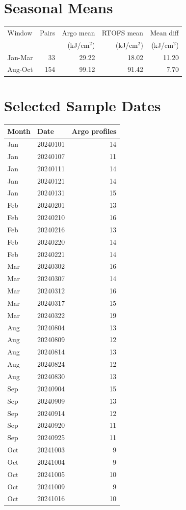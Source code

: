 \documentclass[11pt]{article}
\begin{document}
\section*{Seasonal Means}
\begin{table}[H]
\centering
\begin{tabular}{l r r r r}
\toprule
Window & Pairs & Argo mean & RTOFS mean & Mean diff \\
 &  & (kJ/cm$^2$) & (kJ/cm$^2$) & (kJ/cm$^2$) \\
\midrule
Jan-Mar & 33 & 29.22 & 18.02 & 11.20 \\
Aug-Oct & 154 & 99.12 & 91.42 & 7.70 \\
\bottomrule
\end{tabular}
\end{table}

\section*{Selected Sample Dates}
\begin{table}[H]
\centering
\begin{tabular}{l l r}
\toprule
Month & Date & Argo profiles \\
\midrule
Jan & 20240101 & 14 \\
Jan & 20240107 & 11 \\
Jan & 20240111 & 14 \\
Jan & 20240121 & 14 \\
Jan & 20240131 & 15 \\
Feb & 20240201 & 13 \\
Feb & 20240210 & 16 \\
Feb & 20240216 & 13 \\
Feb & 20240220 & 14 \\
Feb & 20240221 & 14 \\
Mar & 20240302 & 16 \\
Mar & 20240307 & 14 \\
Mar & 20240312 & 16 \\
Mar & 20240317 & 15 \\
Mar & 20240322 & 19 \\
Aug & 20240804 & 13 \\
Aug & 20240809 & 12 \\
Aug & 20240814 & 13 \\
Aug & 20240824 & 12 \\
Aug & 20240830 & 13 \\
Sep & 20240904 & 15 \\
Sep & 20240909 & 13 \\
Sep & 20240914 & 12 \\
Sep & 20240920 & 11 \\
Sep & 20240925 & 11 \\
Oct & 20241003 & 9 \\
Oct & 20241004 & 9 \\
Oct & 20241005 & 10 \\
Oct & 20241009 & 9 \\
Oct & 20241016 & 10 \\
\bottomrule
\end{tabular}
\end{table}
\end{document}
